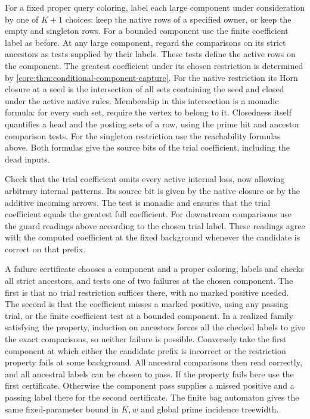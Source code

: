 For a fixed proper query coloring, label each large component
under consideration by one of $K+1$ choices: keep the native
rows of a specified owner, or keep the empty and singleton
rows. For a bounded component use the finite coefficient label
as before. At any large component, regard the comparisons on
its strict ancestors as tests supplied by their labels. These
tests define the active rows on the component. The greatest
coefficient under its chosen restriction is determined by
\cref{core:thm:conditional-component-capture}. For the native
restriction its Horn closure at a seed is the intersection
of all sets containing the seed and closed under the active
native rules. Membership in this intersection is a monadic
formula: for every such set, require the vertex to belong
to it. Closedness itself quantifies a head and the posting
sets of a row, using the prime hit and ancestor comparison
tests. For the singleton restriction use the reachability
formulas above. Both formulas give the source bits of the
trial coefficient, including the dead inputs.

Check that the trial coefficient omits every active internal
loss, now allowing arbitrary internal patterns. Its source
bit is given by the native closure or by the additive
incoming arrows. The test is monadic and ensures that the
trial coefficient equals the greatest full coefficient.
For downstream comparisons use the guard readings above
according to the chosen trial label. These readings agree
with the computed coefficient at the fixed background
whenever the candidate is correct on that prefix.

A failure certificate chooses a component and a proper
coloring, labels and checks all strict ancestors, and tests
one of two failures at the chosen component. The first is
that no trial restriction suffices there, with no marked
positive needed. The second is that the coefficient misses
a marked positive, using any passing trial, or the finite
coefficient test at a bounded component. In a realized
family satisfying the property, induction on ancestors
forces all the checked labels to give the exact comparisons,
so neither failure is possible. Conversely take the first
component at which either the candidate prefix is incorrect
or the restriction property fails at some background.
All ancestral comparisons then read correctly, and all
ancestral labels can be chosen to pass. If the property fails
here use the first certificate. Otherwise the component
pass supplies a missed positive and a passing label there
for the second certificate. The finite bag automaton gives
the same fixed-parameter bound in $K,w$ and global prime
incidence treewidth.

